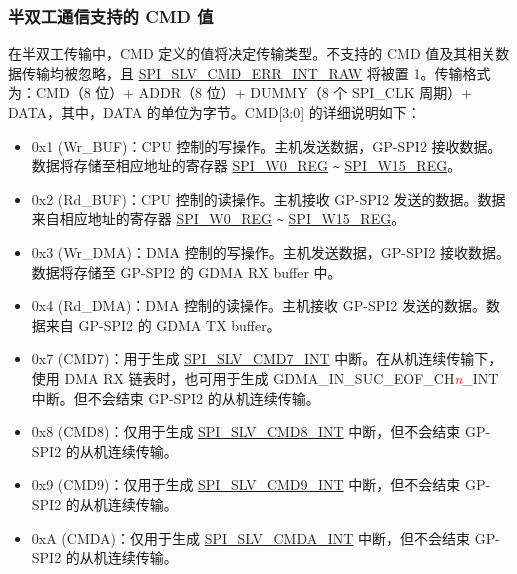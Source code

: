\documentclass[main\_\_CN.tex]{subfiles}
\begin{document}
\subsubsection{半双工通信支持的 CMD 值} \label{GP-SPI2 HD salve format}  

在半双工传输中，CMD 定义的值将决定传输类型。不支持的 CMD 值及其相关数据传输均被忽略，且 \hyperref[fielddesc:SPISLVCMDERRINTRAW]{SPI\_SLV\_CMD\_ERR\_INT\_RAW} 将被置 1。传输格式为：CMD（8 位）+ ADDR（8 位）+ DUMMY（8 个 SPI\_CLK 周期）+ DATA，其中，DATA 的单位为字节。CMD[3:0] 的详细说明如下：


\begin{itemize}
    \item \label{cmd:wrbuf} 0x1 (Wr\_BUF)：CPU 控制的写操作。主机发送数据，GP-SPI2 接收数据。数据将存储至相应地址的寄存器 \hyperref[regdesc:SPIW0REG]{SPI\_W0\_REG} \verb+~+ \hyperref[regdesc:SPIW0REG]{SPI\_W15\_REG}。 
    
    \item \label{cmd:rdbuf} 0x2 (Rd\_BUF)：CPU 控制的读操作。主机接收 GP-SPI2 发送的数据。数据来自相应地址的寄存器 \hyperref[regdesc:SPIW0REG]{SPI\_W0\_REG} \verb+~+ \hyperref[regdesc:SPIW0REG]{SPI\_W15\_REG}。    
    
    \item \label{cmd:wrdma} 0x3 (Wr\_DMA)：DMA 控制的写操作。主机发送数据，GP-SPI2 接收数据。数据将存储至 GP-SPI2 的 GDMA RX buffer 中。
    
    \item \label{cmd:rddma} 0x4 (Rd\_DMA)：DMA 控制的读操作。主机接收 GP-SPI2 发送的数据。数据来自 GP-SPI2 的 GDMA TX buffer。
    
    \item \label{cmd:CMD7} 0x7 (CMD7)：用于生成 \hyperref[int:SPISLVCMD7INT]{SPI\_SLV\_CMD7\_INT} 中断。在从机连续传输下，使用 DMA RX 链表时，也可用于生成 GDMA\_IN\_SUC\_EOF\_CH\textcolor{red}{\it{n}}\_INT  中断。但不会结束 GP-SPI2 的从机连续传输。
    
    \item 0x8 (CMD8)：仅用于生成 \hyperref[int:SPISLVCMD8INT]{SPI\_SLV\_CMD8\_INT} 中断，但不会结束 GP-SPI2 的从机连续传输。

    \item 0x9 (CMD9)：仅用于生成 \hyperref[int:SPISLVCMD9INT]{SPI\_SLV\_CMD9\_INT} 中断，但不会结束 GP-SPI2 的从机连续传输。
    
    \item 0xA (CMDA)：仅用于生成 \hyperref[int:SPISLVCMDAINT]{SPI\_SLV\_CMDA\_INT} 中断，但不会结束 GP-SPI2 的从机连续传输。
    
\end{itemize}
\end{document}
